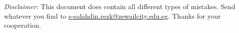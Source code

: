 \noindent \textit{Disclaimer:}
This document does contain all different types of mistakes.
Send whatever you find to
\href{mailto:s-salahdin.rezk@zewailcity.edu.eg}{s-salahdin.rezk@zewailcity.edu.eg}.
Thanks for your cooperation.
